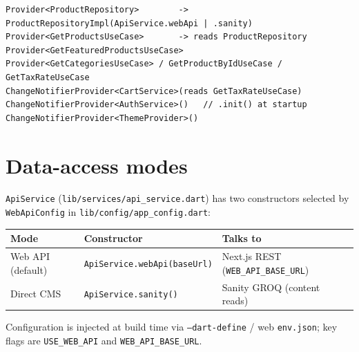 \documentclass[11pt,a4paper]{report}
\newcommand{\code}[1]{\texttt{#1}}
\begin{document}
\begin{lstlisting}[caption={Provider graph (simplified)}]
Provider<ProductRepository>        -> ProductRepositoryImpl(ApiService.webApi | .sanity)
Provider<GetProductsUseCase>       -> reads ProductRepository
Provider<GetFeaturedProductsUseCase>
Provider<GetCategoriesUseCase> / GetProductByIdUseCase / GetTaxRateUseCase
ChangeNotifierProvider<CartService>(reads GetTaxRateUseCase)
ChangeNotifierProvider<AuthService>()   // .init() at startup
ChangeNotifierProvider<ThemeProvider>()
\end{lstlisting}

\section{Data-access modes}
\code{ApiService} (\code{lib/services/api\_service.dart}) has two constructors selected by
\code{WebApiConfig} in \code{lib/config/app\_config.dart}:

\begin{center}\small
\begin{tabular}{@{}lll@{}}
\toprule
\textbf{Mode} & \textbf{Constructor} & \textbf{Talks to}\\
\midrule
Web API (default) & \code{ApiService.webApi(baseUrl)} & Next.js REST (\code{WEB\_API\_BASE\_URL})\\
Direct CMS        & \code{ApiService.sanity()}        & Sanity GROQ (content reads)\\
\bottomrule
\end{tabular}
\end{center}

\noindent Configuration is injected at build time via \code{--dart-define} / web
\code{env.json}; key flags are \code{USE\_WEB\_API} and \code{WEB\_API\_BASE\_URL}.
\end{document}
